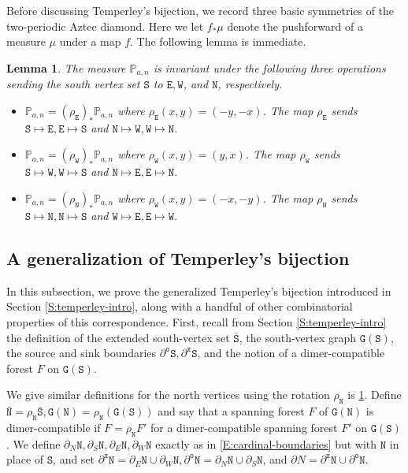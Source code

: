 \documentclass[11pt,twoside]{amsart}
\theoremstyle{plain}
\newtheorem{lem}[thm]{Lemma}
\numberwithin{quest}{section}
\theoremstyle{remark}
\numberwithin{rem}{section}
\theoremstyle{definition}
\renewcommand{\P}{\mathbb{P}}
\renewcommand{\tt}[1]{{\mathtt{#1}}}
\begin{document}
	Before discussing Temperley's bijection, we record three basic symmetries of the two-periodic Aztec diamond. Here we let $f_* \mu$ denote the pushforward of a measure $\mu$ under a map $f$. The following lemma is immediate. 
	
	\begin{lem}
		\label{L:sym}
		The measure $\P_{a, n}$ is invariant under the following three operations sending the south vertex set $\tt{S}$ to $\tt{E}, \tt{W}$, and $\tt{N}$, respectively.
		\begin{itemize}
			\item $\P_{a, n} = (\rho_\tt{E})_* \P_{a, n}$ where $\rho_\tt{E}(x, y) = (-y, -x)$. The map $\rho_\tt{E}$ sends $\tt{S} \mapsto \tt{E}, \tt{E} \mapsto \tt{S}$ and $\tt{N} \mapsto \tt{W}, \tt{W} \mapsto \tt{N}$.
			\item $\P_{a, n} = (\rho_\tt{W})_* \P_{a, n}$ where $\rho_\tt{W}(x, y) = (y, x)$. The map $\rho_\tt{W}$ sends $\tt{S} \mapsto \tt{W}, \tt{W} \mapsto \tt{S}$ and $\tt{N} \mapsto \tt{E}, \tt{E} \mapsto \tt{N}$.
			\item $\P_{a, n} =(\rho_\tt{N})_* \P_{a, n}$ where $\rho_\tt{W}(x, y) = (-x, -y)$. The map $\rho_\tt{N}$ sends $\tt{S} \mapsto \tt{N}, \tt{N} \mapsto \tt{S}$ and $\tt{W} \mapsto \tt{E}, \tt{E} \mapsto \tt{W}$.
		\end{itemize}
	\end{lem}
	
	
	\subsection{A generalization of Temperley's bijection} \qquad
	
	In this subsection, we prove the generalized Temperley's bijection introduced in Section \ref{S:temperley-intro}, along with a handful of other combinatorial properties of this correspondence. First, recall from Section \ref{S:temperley-intro} the definition of the extended south-vertex set $\tt{\bar S}$, the south-vertex graph $\tt{G(S)}$, the source and sink boundaries  $\partial^{\tt{o}} \tt{S}, \partial^{\tt{x}} \tt{S}$, and the notion of a dimer-compatible forest $F$ on $\tt{G(S)}$. 
	
	We give similar definitions for the north vertices using the rotation $\rho_\tt{N}$ is \cref{L:sym}. Define $\tt{\bar N} = \rho_\tt{N} \tt{\bar S}, \tt{G}(\tt{N}) = \rho_\tt{N} (\tt{G}(\tt{S}))$ and say that a spanning forest $F$ of $\tt{G}(\tt{N})$ is dimer-compatible if $F = \rho_\tt{N} F'$ for a dimer-compatible spanning forest $F'$ on $\tt{G}(\tt{S})$. We define  $\partial_N \tt{N}, \partial_S \tt{N}, \partial_E \tt{N}, \partial_W \tt{N}$ exactly as in \eqref{E:cardinal-boundaries} but with $\tt{N}$ in place of $\tt{S}$, and set $\partial^\tt{x} \tt{N} = \partial_E \tt{N} \cup \partial_W \tt{N}, \partial^\tt{o} \tt{N} = \partial_N \tt{N} \cup \partial_S \tt{N}$, and $\partial N = \partial^\tt{x} \tt{N} \cup \partial^\tt{o} \tt{N}$.
	
\end{document}
